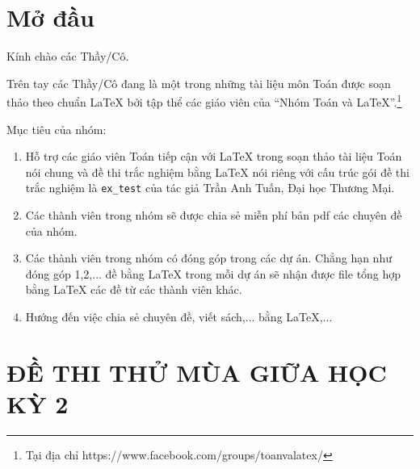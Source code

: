 \documentclass[12pt,a4paper,oneside]{book}
\renewcommand{\baselinestretch}{1.4}
\begin{document}
%	
	\pagestyle{empty}
	\renewcommand{\headrulewidth}{0.4pt}
	
	\renewcommand{\baselinestretch}{1.3}
	
	
	\pagestyle{fancy}
	\chead{\empty}
	\rhead{\currfilename}
	\lfoot{\empty}
	\tableofcontents
		\chapter*{Mở đầu}
	Kính chào các Thầy/Cô.
	
	\vspace{0.6cm}
	
	\noindent Trên tay các Thầy/Cô đang là một trong những tài liệu môn Toán được soạn thảo theo chuẩn \LaTeX{} bởi tập thể các giáo viên của ``Nhóm Toán và LaTeX''.\footnote{Tại địa chỉ https://www.facebook.com/groups/toanvalatex/}
	
	\vspace{0.6cm}
	
	\noindent Mục tiêu của nhóm: 
	\begin{enumerate}
		\item Hỗ trợ các giáo viên Toán tiếp cận với \LaTeX{} trong soạn thảo tài liệu Toán nói chung và đề thi trắc nghiệm bằng \LaTeX{} nói riêng với cấu trúc gói đề thi trắc nghiệm là \texttt{ex\_test} của tác giả Trần Anh Tuấn, Đại học Thương Mại.
		\item Các thành viên trong nhóm sẽ được chia sẻ miễn phí bản pdf  các chuyên đề của nhóm.
		\item Các thành viên trong nhóm có đóng góp trong các dự án. Chẳng hạn như đóng góp 1,2,... đề bằng \LaTeX{} trong mỗi dự án sẽ nhận được file tổng hợp bằng \LaTeX{} các đề từ các thành viên khác.
		\item Hướng đến việc chia sẻ chuyên đề, viết sách,... bằng \LaTeX,...
	\end{enumerate}

\chapter{ĐỀ THI THỬ MÙA GIỮA HỌC KỲ 2}

\newpage
\newpage
\newpage
\newpage
\newpage 
\newpage 
\newpage 
\newpage 
\newpage 
\newpage
\newpage
\newpage
\end{document}
